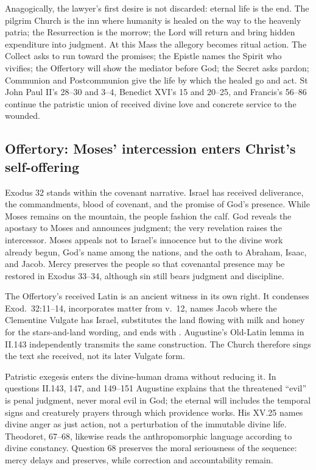 Anagogically, the lawyer's first desire is not discarded: eternal life is the
end. The pilgrim Church is the inn where humanity is healed on the way to the
heavenly patria; the Resurrection is the morrow; the Lord will return and
bring hidden expenditure into judgment. At this Mass the allegory becomes
ritual action. The Collect asks to run toward the promises; the Epistle names
the Spirit who vivifies; the Offertory will show the mediator before God; the
Secret asks pardon; Communion and Postcommunion give the life by which the
healed go and act. St John Paul II's  28--30 and
 3--4, Benedict XVI's 
15 and 20--25, and Francis's  56--86 continue the
patristic union of received divine love and concrete service to the wounded.

\elementguard
\subsection*{Offertory: Moses' intercession enters Christ's self-offering }

Exodus 32 stands within the covenant narrative. Israel has received
deliverance, the commandments, blood of covenant, and the promise of God's
presence. While Moses remains on the mountain, the people fashion the calf.
God reveals the apostasy to Moses and announces judgment; the very revelation
raises the intercessor. Moses appeals not to Israel's innocence but to the
divine work already begun, God's name among the nations, and the oath to
Abraham, Isaac, and Jacob. Mercy preserves the people so that covenantal
presence may be restored in Exodus 33--34, although sin still bears judgment
and discipline.

The Offertory's received Latin is an ancient witness in its own right. It
condenses Exod.~32:11--14, incorporates matter from v.~12, names Jacob where
the Clementine Vulgate has Israel, substitutes the land flowing with milk and
honey for the stars-and-land wording, and ends with
. Augustine's Old-Latin lemma in 
II.143 independently transmits the same construction. The Church therefore
sings the text she received, not its later Vulgate form.

Patristic exegesis enters the divine-human drama without reducing it. In
questions II.143, 147, and 149--151 Augustine explains that the threatened
``evil'' is penal judgment, never moral evil in God; the eternal will includes
the temporal signs and creaturely prayers through which providence works. His
 XV.25 names divine anger as just action, not a perturbation
of the immutable divine life. Theodoret,  67--68,
likewise reads the anthropomorphic language according to divine constancy.
Question 68 preserves the moral seriousness of the sequence: mercy delays and
preserves, while correction and accountability remain.

